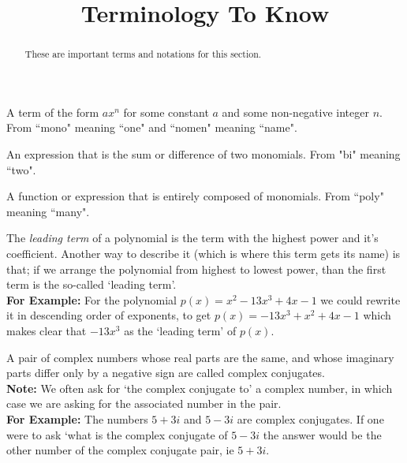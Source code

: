 \documentclass{ximeraXloud}
\title{Terminology To Know}
\begin{document}
\begin{abstract}
    These are important terms and notations for this section.
\end{abstract}
\maketitle


\begin{definition}[Monomial]
    A term of the form $ax^n$ for some constant $a$ and some non-negative integer $n$. From ``mono" meaning ``one" and ``nomen" meaning ``name".
\end{definition} 

\begin{definition}[Binomial]
    An expression that is the sum or difference of two monomials. From "bi" meaning ``two".
\end{definition} 

 \begin{definition}[Polynomial]
    A function or expression that is entirely composed of monomials. From ``poly" meaning ``many".
\end{definition} 

\begin{definition}
    The \textit{leading term} of a polynomial is the term with the highest power and it's coefficient. Another way to describe it (which is where this term gets its name) is that; if we arrange the polynomial from highest to lowest power, than the first term is the so-called `leading term'.\\
    \textbf{For Example:} For the polynomial $p(x) = x^2 - 13x^3 + 4x - 1$ we could rewrite it in descending order of exponents, to get $p(x) = -13x^3 + x^2 + 4x - 1$ which makes clear that $-13x^3$ as the `leading term' of $p(x)$.
\end{definition} 

\begin{definition}
    A pair of complex numbers whose real parts are the same, and whose imaginary parts differ only by a negative sign are called complex conjugates. \\
    \textbf{Note:} We often ask for `the complex conjugate to' a complex number, in which case we are asking for the associated number in the pair. \\
    \textbf{For Example:} The numbers $5 + 3i$ and $5 - 3i$ are complex conjugates. If one were to ask `what is the complex conjugate of $5 - 3i$ the answer would be the other number of the complex conjugate pair, ie $5 + 3i$.
\end{definition} 
\end{document}
